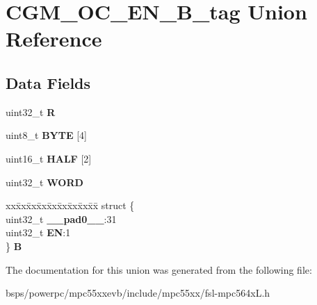 \hypertarget{unionCGM__OC__EN__32B__tag}{}\section{C\+G\+M\+\_\+\+O\+C\+\_\+\+E\+N\+\_\+B\+\_\+tag Union Reference}
\label{unionCGM__OC__EN__32B__tag}
\subsection*{Data Fields}
\begin{DoxyCompactItemize}
\item 
\mbox{\label{unionCGM__OC__EN__32B__tag_a0b8ada6b292fecc594373de3e417d4ed}} 
uint32\+\_\+t {\bfseries R}
\item 
\mbox{\label{unionCGM__OC__EN__32B__tag_ad1c79b8718ec4805bf6b4ee949bfb16d}} 
uint8\+\_\+t {\bfseries B\+Y\+TE} \mbox{[}4\mbox{]}
\item 
\mbox{\label{unionCGM__OC__EN__32B__tag_a99504b17e1a1e12fecc72c02b7649bf1}} 
uint16\+\_\+t {\bfseries H\+A\+LF} \mbox{[}2\mbox{]}
\item 
\mbox{\label{unionCGM__OC__EN__32B__tag_ad0d10e57d3bdb344bf2724efd25dc818}} 
uint32\+\_\+t {\bfseries W\+O\+RD}
\item 
\mbox{\label{unionCGM__OC__EN__32B__tag_a3b33eacb1b4a00cb1b9c42e7f3319466}} 
\begin{tabbing}
xx\=xx\=xx\=xx\=xx\=xx\=xx\=xx\=xx\=\kill
struct \{\\
\>uint32\_t {\bfseries \_\_pad0\_\_}:31\\
\>uint32\_t {\bfseries EN}:1\\
\} {\bfseries B}\\

\end{tabbing}\end{DoxyCompactItemize}


The documentation for this union was generated from the following file\+:\begin{DoxyCompactItemize}
\item 
bsps/powerpc/mpc55xxevb/include/mpc55xx/fsl-\/mpc564x\+L.\+h\end{DoxyCompactItemize}
